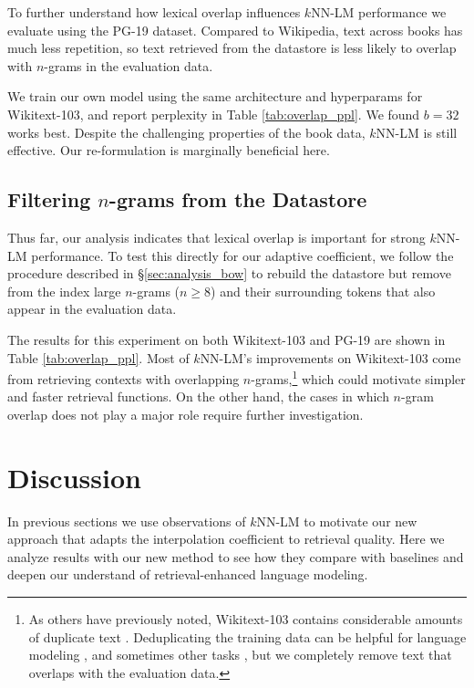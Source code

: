 \documentclass[11pt]{article}
\begin{document}
To further understand how lexical overlap influences $k$NN-LM performance we evaluate using the PG-19 dataset. Compared to Wikipedia, text across books has much less repetition, so text retrieved from the datastore is less likely to overlap with $n$-grams in the evaluation data.

We train our own model using the same architecture and hyperparams for Wikitext-103, and report perplexity in Table \ref{tab:overlap_ppl}. We found $b =32$ works best. Despite the challenging properties of the book data, $k$NN-LM is still effective. Our re-formulation is marginally beneficial here.

\subsection{Filtering $n$-grams from the Datastore}

Thus far, our analysis indicates that lexical overlap is important for strong $k$NN-LM performance. To test this directly for our adaptive coefficient, we follow the procedure described in \S\ref{sec:analysis_bow} to rebuild the datastore but remove from the index large $n$-grams ($n \geq 8$) and their surrounding tokens that also appear in the evaluation data.

The results for this experiment on both Wikitext-103 and PG-19 are shown in Table \ref{tab:overlap_ppl}. Most of $k$NN-LM's improvements on Wikitext-103 come from retrieving contexts with overlapping $n$-grams,\footnote{As others have previously noted, Wikitext-103 contains considerable amounts of duplicate text \cite{McCoy2021HowMD}. Deduplicating the training data can be helpful for language modeling \cite{lee-etal-2022-deduplicating,dedup2022kandpal}, and sometimes other tasks \cite{schofield-etal-2017-quantifying}, but we completely remove text that overlaps with the evaluation data.} which could motivate simpler and faster retrieval functions. On the other hand, the cases in which $n$-gram overlap does not play a major role require further investigation. 

\section{Discussion}

In previous sections we use observations of $k$NN-LM to motivate our new approach that adapts the interpolation coefficient to retrieval quality. Here we analyze results with our new method to see how they compare with baselines and deepen our understand of retrieval-enhanced language modeling.
\end{document}
